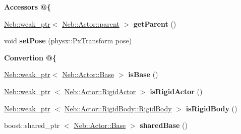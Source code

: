 \begin{Indent}{\bf \-Accessors @\{}
\begin{DoxyCompactItemize}
\item 
\hypertarget{classNeb_1_1Actor_1_1Base_a337260a793f790c8f69b9115c2e148c4}{\hyperlink{classNeb_1_1weak__ptr}{\-Neb\-::weak\-\_\-ptr}$<$ \hyperlink{classNeb_1_1Actor_1_1parent}{\-Neb\-::\-Actor\-::parent} $>$ {\bfseries get\-Parent} ()}\label{classNeb_1_1Actor_1_1Base_a337260a793f790c8f69b9115c2e148c4}

\item 
\hypertarget{classNeb_1_1Actor_1_1Base_a98dd3ef316b4d28c5f36efa2d1e73966}{void {\bfseries set\-Pose} (physx\-::\-Px\-Transform pose)}\label{classNeb_1_1Actor_1_1Base_a98dd3ef316b4d28c5f36efa2d1e73966}

\end{DoxyCompactItemize}
\end{Indent}
\begin{Indent}{\bf \-Convertion @\{}\par
\begin{DoxyCompactItemize}
\item 
\hypertarget{classNeb_1_1Actor_1_1Base_ae6f52ed167597ae415bc07a4d195eb48}{\hyperlink{classNeb_1_1weak__ptr}{\-Neb\-::weak\-\_\-ptr}$<$ \hyperlink{classNeb_1_1Actor_1_1Base}{\-Neb\-::\-Actor\-::\-Base} $>$ {\bfseries is\-Base} ()}\label{classNeb_1_1Actor_1_1Base_ae6f52ed167597ae415bc07a4d195eb48}

\item 
\hypertarget{classNeb_1_1Actor_1_1Base_a9ceae55c5cdcd96ef35f265a50fd7a7f}{\hyperlink{classNeb_1_1weak__ptr}{\-Neb\-::weak\-\_\-ptr}\*
$<$ \hyperlink{classNeb_1_1Actor_1_1RigidActor}{\-Neb\-::\-Actor\-::\-Rigid\-Actor} $>$ {\bfseries is\-Rigid\-Actor} ()}\label{classNeb_1_1Actor_1_1Base_a9ceae55c5cdcd96ef35f265a50fd7a7f}

\item 
\hypertarget{classNeb_1_1Actor_1_1Base_a96ca5aa2dd09f282a209a2272bcb00c2}{\hyperlink{classNeb_1_1weak__ptr}{\-Neb\-::weak\-\_\-ptr}\*
$<$ \hyperlink{classNeb_1_1Actor_1_1RigidBody_1_1RigidBody}{\-Neb\-::\-Actor\-::\-Rigid\-Body\-::\-Rigid\-Body} $>$ {\bfseries is\-Rigid\-Body} ()}\label{classNeb_1_1Actor_1_1Base_a96ca5aa2dd09f282a209a2272bcb00c2}

\item 
\hypertarget{classNeb_1_1Actor_1_1Base_ab3057dd41eaf5ab21879d005366eb53b}{boost\-::shared\-\_\-ptr\*
$<$ \hyperlink{classNeb_1_1Actor_1_1Base}{\-Neb\-::\-Actor\-::\-Base} $>$ {\bfseries shared\-Base} ()}\label{classNeb_1_1Actor_1_1Base_ab3057dd41eaf5ab21879d005366eb53b}

\end{DoxyCompactItemize}
\end{Indent}
